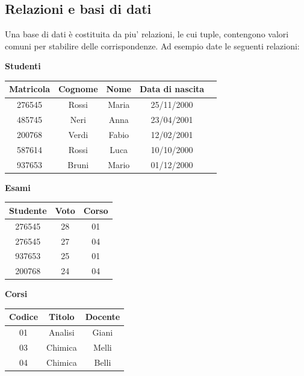 \documentclass[12pt]{report}
\begin{document}
	\subsection{Relazioni e basi di dati}
	Una base di dati è costituita da piu' relazioni, le cui tuple, contengono valori comuni per stabilire delle corrispondenze. Ad esempio date le seguenti relazioni:
	\begin{center}

		\textbf{Studenti}

		\vspace{0.5cm}

		\begin{tabular}{|c|c|c|c|c|}
			\hline
			\textbf{Matricola} & \textbf{Cognome} & \textbf{Nome} & \textbf{Data di nascita} \\
			\hline
			276545 & Rossi & Maria & 25/11/2000 \\
			485745 & Neri & Anna & 23/04/2001 \\
			200768 & Verdi & Fabio & 12/02/2001 \\
			587614 & Rossi & Luca & 10/10/2000 \\
			937653 & Bruni & Mario & 01/12/2000 \\
			\hline
		\end{tabular}

		\vspace{1.5cm}

		\begin{minipage}[t]{0.45\textwidth}
			\centering
			\textbf{Esami}

			\vspace{0.5cm}

			\begin{tabular}{|c|c|c|}
				\hline
				\textbf{Studente} & \textbf{Voto} & \textbf{Corso} \\
				\hline
				276545 & 28 & 01 \\
				276545 & 27 & 04 \\
				937653 & 25 & 01 \\
				200768 & 24 & 04 \\
				\hline
			\end{tabular}
		\end{minipage}
		\hfill
		\begin{minipage}[t]{0.45\textwidth}
			\centering
			\textbf{Corsi}

			\vspace{0.5cm}

			\begin{tabular}{|c|c|c|}
				\hline
				\textbf{Codice} & \textbf{Titolo} & \textbf{Docente} \\
				\hline
				01 & Analisi & Giani \\
				03 & Chimica & Melli \\
				04 & Chimica & Belli \\
				\hline
			\end{tabular}
		\end{minipage}

	\end{center}
\end{document}
